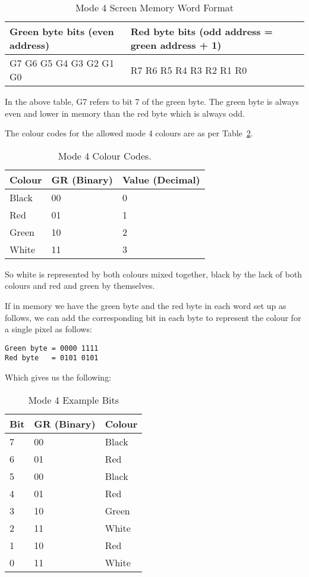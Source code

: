 \begin{table}[htbp]
\centering
\begin{tabular}{l l}
\toprule
\textbf{Green byte bits (even address)} & \textbf{Red byte bits (odd address = green address + 1)}  \\
\midrule
%
G7 G6 G5 G4 G3 G2 G1 G0 & R7 R6 R5 R4 R3 R2 R1 R0 \\
%
\bottomrule
\end{tabular}
\caption{Mode 4 Screen Memory Word Format}
\label{tab:Mode4ScreeMemoryWordFormat}
\end{table}



In the above table, G7 refers to bit 7 of the green byte. The green
    byte is always even and lower in memory than the red byte which is always
    odd.

The colour codes for the allowed mode 4 colours are as per Table~\ref{tab:Mode4ColourCodes}.
\begin{table}[htbp]
\centering
\begin{tabular}{l l l}
\toprule
\textbf{Colour} & \textbf{GR (Binary)} & \textbf{Value (Decimal)}  \\
\midrule
%
Black & 00 & 0 \\
Red   & 01 & 1 \\
Green & 10 & 2 \\
White & 11 & 3 \\
%
\bottomrule
\end{tabular}
\caption{Mode 4 Colour Codes.}
\label{tab:Mode4ColourCodes}
\end{table}

So white is represented by both colours mixed together, black by the
    lack of both colours and red and green by themselves.

If in memory we have the green byte and the red byte in each word
    set up as follows, we can add the corresponding bit in each byte to
    represent the colour for a single pixel as follows:


\begin{lstlisting}[frame=none,numbers=none]
Green byte = 0000 1111 
Red byte   = 0101 0101
\end{lstlisting}

Which gives us the following:


\begin{table}[htbp]
\centering
\begin{tabular}{l l l}
\toprule
\textbf{Bit} & \textbf{GR (Binary)} & \textbf{Colour}  \\
\midrule
%
7 & 00 & Black \\
6 & 01 & Red \\
5 & 00 & Black \\
4 & 01 & Red \\
3 & 10 & Green \\
2 & 11 & White \\
1 & 10 & Red \\
0 & 11 & White \\
%
\bottomrule
\end{tabular}
\caption{Mode 4 Example Bits}
\label{tab:Mode4ExampleBits}
\end{table}


